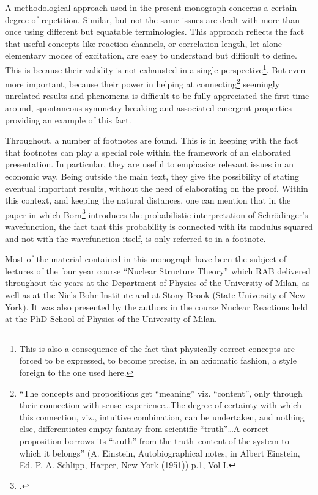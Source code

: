 A methodological approach used in the present monograph concerns a certain degree of repetition. Similar, but not the same issues are dealt with more than once using different but equatable terminologies. This approach reflects the fact that useful concepts like reaction channels, or correlation length, let alone elementary modes of excitation, are easy to understand but difficult to define. This is because their validity is not exhausted in a single perspective\footnote{This is also a consequence of the fact that physically correct concepts are forced to be expressed, to become precise, in an axiomatic fashion, a style foreign to the one used here.}. But even more important, because their power in helping at connecting\footnote{``The concepts and propositions get ``meaning'' viz. ``content'', only through their connection with sense--experience\dots The degree of certainty with which this connection, viz., intuitive combination, can be undertaken, and nothing else, differentiates empty fantasy from scientific ``truth''\dots A correct proposition borrows its ``truth'' from the truth--content of the system to which it belongs'' (A. Einstein, Autobiographical notes, in Albert Einstein, Ed. P. A. Schlipp, Harper, New York (1951)) p.1, Vol I.} seemingly unrelated results and phenomena is difficult to be fully appreciated the first time around, spontaneous symmetry breaking and associated emergent properties providing an example of this fact.


Throughout, a number of footnotes are found. This is in keeping with the fact that footnotes can play a special role within the framework of an elaborated presentation. In particular, they are useful to emphasize relevant issues in an economic way. Being outside the main text, they give the possibility of stating eventual important results, without the need of elaborating on the proof. Within this context, and keeping the natural distances, one can mention that in the paper  in which Born\footnote{\cite{Born:26}.} introduces the probabilistic interpretation of Schr\"odinger's  wavefunction, the fact that this probability is connected with its modulus squared and not with the wavefunction itself, is only referred to in a footnote.



  Most of the material contained in this monograph have been the subject of lectures of the four year course ``Nuclear Structure Theory'' which RAB delivered throughout the years at the Department of Physics of the University of Milan, as well as at the Niels Bohr Institute and at Stony Brook (State University of New York). It was also presented by the authors in the course Nuclear Reactions held at the PhD School of Physics of the University of Milan.

